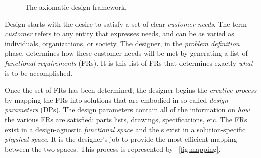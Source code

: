 \begin{figure}[H]
  \label{fig:design}
  \caption{The axiomatic design framework.}
\end{figure}

Design starts with the desire to satisfy a set of clear \emph{customer needs}.  The term \emph{customer} refers to
any entity that expresses needs, and can be as varied as individuals, organizations, or society.  The designer, in
the \emph{problem definition} phase, determines how these customer needs will be met by generating a list of
\emph{functional requirements} (FRs).  It is this list of FRs that determines exactly \emph{what} is to be
accomplished.

Once the set of FRs has been determined, the designer begins the \emph{creative process} by mapping the FRs into
solutions that are embodied in so-called \emph{design parameters} (DPs).  The design parameters contain all of the
information on \emph{how} the various FRs are satisfied: parts lists, drawings, specifications, etc.  The FRs exist
in a design-agnostic \emph{functional space} and the {\DP}s exist in a solution-specific \emph{physical space}.  It
is the designer's job to provide the most efficient mapping between the two spaces.  This process is represented by
\figurename~\ref{fig:mapping}.

